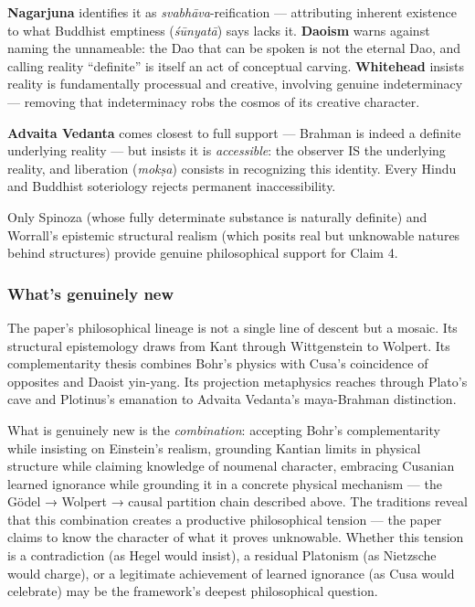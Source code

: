 \documentclass[
]{article}
\begin{document}
\textbf{Nagarjuna} identifies it as \emph{svabhāva}-reification ---
attributing inherent existence to what Buddhist emptiness
(\emph{śūnyatā}) says lacks it. \textbf{Daoism} warns against naming the
unnameable: the Dao that can be spoken is not the eternal Dao, and
calling reality ``definite'' is itself an act of conceptual carving.
\textbf{Whitehead} insists reality is fundamentally processual and
creative, involving genuine indeterminacy --- removing that
indeterminacy robs the cosmos of its creative character.

\textbf{Advaita Vedanta} comes closest to full support --- Brahman is
indeed a definite underlying reality --- but insists it is
\emph{accessible}: the observer IS the underlying reality, and
liberation (\emph{mokṣa}) consists in recognizing this identity. Every
Hindu and Buddhist soteriology rejects permanent inaccessibility.

Only Spinoza (whose fully determinate substance is naturally definite)
and Worrall's epistemic structural realism (which posits real but
unknowable natures behind structures) provide genuine philosophical
support for Claim 4.

\hypertarget{whats-genuinely-new}{%
\subsubsection{What's genuinely new}\label{whats-genuinely-new}}

The paper's philosophical lineage is not a single line of descent but a
mosaic. Its structural epistemology draws from Kant through Wittgenstein
to Wolpert. Its complementarity thesis combines Bohr's physics with
Cusa's coincidence of opposites and Daoist yin-yang. Its projection
metaphysics reaches through Plato's cave and Plotinus's emanation to
Advaita Vedanta's maya-Brahman distinction.

What is genuinely new is the \emph{combination}: accepting Bohr's
complementarity while insisting on Einstein's realism, grounding Kantian
limits in physical structure while claiming knowledge of noumenal
character, embracing Cusanian learned ignorance while grounding it in a
concrete physical mechanism --- the Gödel → Wolpert → causal partition
chain described above. The traditions reveal that this combination
creates a productive philosophical tension --- the paper claims to know
the character of what it proves unknowable. Whether this tension is a
contradiction (as Hegel would insist), a residual Platonism (as
Nietzsche would charge), or a legitimate achievement of learned
ignorance (as Cusa would celebrate) may be the framework's deepest
philosophical question.
\end{document}
